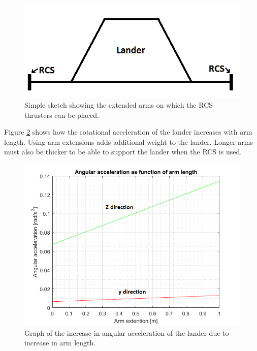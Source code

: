 \begin{figure}[htb]
\begin{center}
\includegraphics[scale=0.8]{figures/RCS/Lunar_arms}
\caption{Simple sketch showing the extended arms on which the RCS thrusters can be placed.}
\label{fig:arms}
\end{center}
\end{figure}

\noindent
Figure \ref{fig:arms_graph} shows how the rotational acceleration of the lander increases with arm length. Using arm extensions adds additional weight to the lander. Longer arms must also  be thicker to be able to support the lander when the RCS is used.

\begin{figure}[htb]
\begin{center}
\includegraphics[scale=0.6]{figures/RCS/arm_graph}
\caption{Graph of the increase in angular acceleration of the lander due to increase in arm length.}
\label{fig:arms_graph}
\end{center}
\end{figure}

